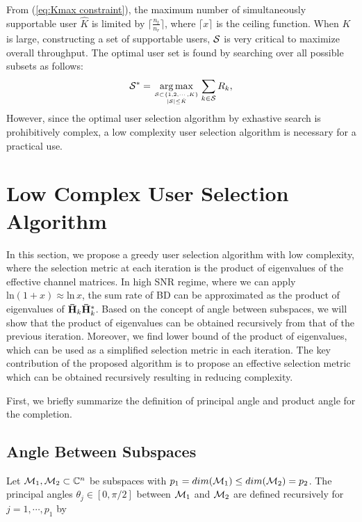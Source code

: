 \documentclass[journal,twoside]{IEEEtranTCOM}
\begin{document}
From (\ref{eq:Kmax constraint}), the maximum number of simultaneously supportable user $\hat{K}$ is limited by $\lceil \frac{{{n_t}}}{{{n_r}}} \rceil$, where $\lceil x \rceil$ is the ceiling function. When $K$ is large, constructing a set of supportable users, $\cal{S}$ is very critical to maximize overall throughput. The optimal user set is found by searching over all possible subsets as follows:
\begin{equation} \label{eq:OptUserSet}
{{\mathcal{S}}^*} = \mathop {\arg \max }\limits_{{\mathcal{S}} \subset \{ 1,2, \cdots ,K\} \atop | {\mathcal{S}} | \le \hat K} \sum\limits_{k \in \mathcal{S}} R_k,
\end{equation}
However, since the optimal user selection algorithm by exhastive search is prohibitively complex, a low complexity user selection algorithm is necessary for a practical use.

\section{Low Complex User Selection Algorithm} \label{Section:Algorithm}
In this section, we propose a greedy user selection algorithm with low complexity, where the selection metric at each iteration is the product of eigenvalues of the effective channel matrices. In high SNR regime, where we can apply $\mathrm{ln}(1+x) \approx \mathrm{ln} \, x$, the sum rate of BD can be approximated as the product of eigenvalues of ${{\bf{\bar H}}_k}{{\bf{\bar H}}^*_k}$. Based on the concept of angle between subspaces, we will show that the product of eigenvalues can be obtained recursively from that of the previous iteration. Moreover, we find lower bound of the product of eigenvalues, which can be used as a simplified selection metric in each iteration. The key contribution of the proposed algorithm is to propose an effective selection metric which can be obtained recursively resulting in reducing complexity.

First, we briefly summarize the definition of principal angle and product angle for the completion.

\subsection{Angle Between Subspaces}
Let ${\cal{M}}_1,{\cal{M}}_2 \subset \mathbb{C}^n$ be subspaces with $p_1=dim({\cal{M}}_1) \leq dim({\cal{M}}_2)=p_2$. The principal angles $\theta_j \in [0, \pi/2]$ between ${\cal{M}}_1$ and ${\cal{M}}_2$ are  defined recursively for $j=1,\cdots,p_1$ by \cite{PrincipalAngle,Angle-SVD}
\end{document}

